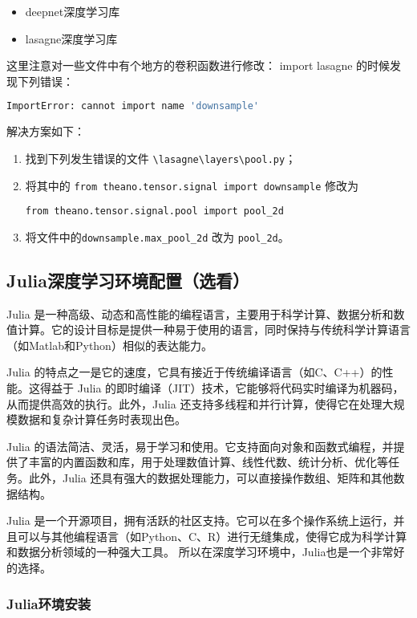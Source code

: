 \documentclass[lang=cn,a4paper,newtx]{elegantpaper}
\begin{document}
\begin{itemize}
  \item deepnet深度学习库
  \item lasagne深度学习库
\end{itemize}

这里注意对一些文件中有个地方的卷积函数进行修改：
import lasagne 的时候发现下列错误：
\begin{lstlisting}[language=bash]
  ImportError: cannot import name 'downsample'
\end{lstlisting}

解决方案如下：
\begin{enumerate}[label=\arabic*). ]
  \item 找到下列发生错误的文件 \verb|\lasagne\layers\pool.py|；
  \item 将其中的 \verb|from theano.tensor.signal import downsample| 修改为
	
  \verb|from theano.tensor.signal.pool import pool_2d|
  \item 将文件中的\verb|downsample.max_pool_2d| 改为  \verb|pool_2d|。
\end{enumerate}

\subsection{Julia深度学习环境配置（选看）}
Julia 是一种高级、动态和高性能的编程语言，主要用于科学计算、数据分析和数值计算。它的设计目标是提供一种易于使用的语言，同时保持与传统科学计算语言（如Matlab和Python）相似的表达能力。

Julia 的特点之一是它的速度，它具有接近于传统编译语言（如C、C++）的性能。这得益于 Julia 的即时编译（JIT）技术，它能够将代码实时编译为机器码，从而提供高效的执行。此外，Julia 还支持多线程和并行计算，使得它在处理大规模数据和复杂计算任务时表现出色。

Julia 的语法简洁、灵活，易于学习和使用。它支持面向对象和函数式编程，并提供了丰富的内置函数和库，用于处理数值计算、线性代数、统计分析、优化等任务。此外，Julia 还具有强大的数据处理能力，可以直接操作数组、矩阵和其他数据结构。

Julia 是一个开源项目，拥有活跃的社区支持。它可以在多个操作系统上运行，并且可以与其他编程语言（如Python、C、R）进行无缝集成，使得它成为科学计算和数据分析领域的一种强大工具。
所以在深度学习环境中，Julia也是一个非常好的选择。
\subsubsection{Julia环境安装}
\end{document}
